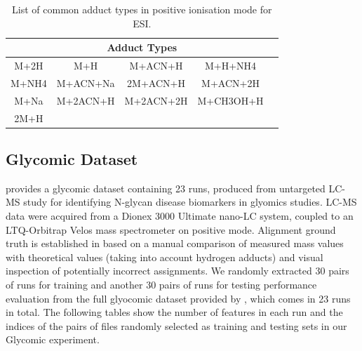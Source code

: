 \begin{table}[!htbp]
\begin{centering}
\begin{tabular}{|ccccc|}
\hline 
\multicolumn{5}{|c|}{{\footnotesize{}Adduct Types}}\tabularnewline
\hline 
\hline 
{\footnotesize{}M+2H} & {\footnotesize{}M+H} & {\footnotesize{}M+ACN+H} & {\footnotesize{}M+H+NH4} & \tabularnewline
{\footnotesize{}M+NH4} & {\footnotesize{}M+ACN+Na} & {\footnotesize{}2M+ACN+H} & {\footnotesize{}M+ACN+2H} & \tabularnewline
{\footnotesize{}M+Na} & {\footnotesize{}M+2ACN+H} & {\footnotesize{}M+2ACN+2H} & {\footnotesize{}M+CH3OH+H} & \tabularnewline
{\footnotesize{}2M+H} &  &  &  & \tabularnewline
\hline 
\end{tabular}
\par\end{centering}
\caption{List of common adduct types in positive ionisation mode for ESI.\label{tab:adducts}}
\end{table}

\subsection{Glycomic Dataset\label{sub:glycomic-dataset}}

\cite{Tsai2013a} provides a glycomic dataset containing 23 runs, produced from untargeted LC-MS study for identifying N-glycan disease biomarkers in glyomics studies. LC-MS data were acquired from a Dionex 3000 Ultimate nano-LC system, coupled to an LTQ-Orbitrap Velos mass spectrometer on positive mode. Alignment ground truth is established in \cite{Tsai2013a} based on a manual comparison of measured mass values with theoretical values (taking into account hydrogen adducts) and visual inspection of potentially incorrect assignments. We randomly extracted 30 pairs of runs for training and another 30 pairs of runs for testing performance evaluation from the full glyocomic dataset provided by \cite{Tsai2013a}, which comes in 23 runs in total. The following tables show the number of features in each run and the indices of the pairs of files randomly selected as training and testing sets in our Glycomic experiment.

